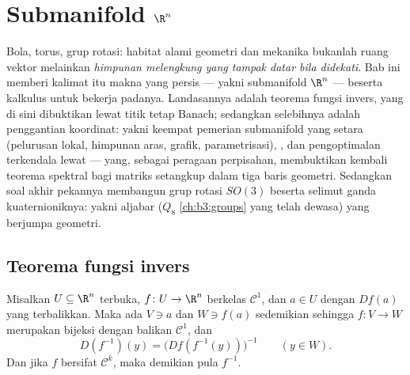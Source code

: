 \chapter{Submanifold \texorpdfstring{$\R^n$}{Rn}}
\label{ch:b3:submanifolds}

Bola, torus, grup rotasi: habitat alami
geometri dan mekanika bukanlah ruang vektor melainkan \emph{himpunan
melengkung yang tampak datar bila didekati}. Bab ini memberi kalimat itu
makna yang persis --- yakni submanifold $\R^n$ --- beserta
kalkulus untuk bekerja padanya. Landasannya adalah teorema fungsi
invers, yang di sini dibuktikan lewat titik tetap Banach;
sedangkan selebihnya adalah penggantian koordinat: yakni keempat pemerian
submanifold yang setara (pelurusan lokal, himpunan aras,
grafik, parametrisasi), , dan pengoptimalan
terkendala lewat  --- yang, sebagai peragaan
perpisahan, membuktikan kembali teorema spektral bagi matriks setangkup
dalam tiga baris geometri. Sedangkan soal akhir pekannya
membangun grup rotasi $SO(3)$ beserta selimut ganda kuaternioniknya:
yakni aljabar ($Q_8$ \cref{ch:b3:groups} yang telah dewasa) yang
berjumpa geometri.

\section{Teorema fungsi invers}

\begin{theorem}
\label{thm:b3:submanifolds:ift}
Misalkan $U \subseteq \R^n$ terbuka, $f \colon U \to \R^n$ berkelas
$\mathcal C^1$, dan $a \in U$ dengan $Df(a)$ yang terbalikkan.
Maka ada  $V \ni a$ dan $W \ni f(a)$ sedemikian sehingga
$f \colon V \to W$ merupakan bijeksi dengan balikan $\mathcal C^1$,
dan
\[
D(f^{-1})(y) = \bigl(Df(f^{-1}(y))\bigr)^{-1}
\qquad (y \in W).
\]
Dan jika $f$ bersifat $\mathcal C^k$, maka demikian pula $f^{-1}$.
\end{theorem}

